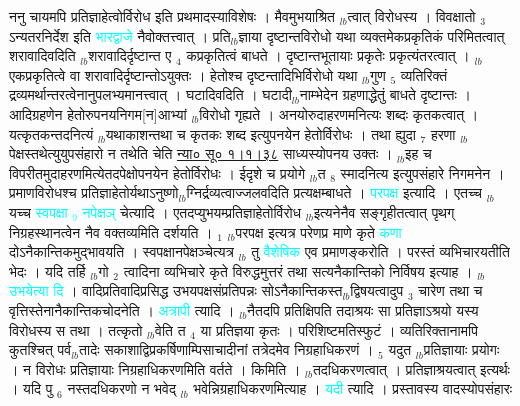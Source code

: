 \documentclass[article,12pt,a4paper]{memoir}%
\newcommand{\quotelemma}[1]{\textcolor{cyan}{#1}}
\begin{document}
	  
	  \pstart \leavevmode%
	ननु चायमपि प्रतिज्ञाहेत्वोर्विरोध इति प्रथमादस्याविशेषः । मैवमुभयाश्रित {\tiny $_{lb}$}त्वात् विरोधस्य । विवक्षातो {\tiny $_{3}$} ऽन्यतरनिर्देश इति \quotelemma{भारद्वाजे} नैवोक्तत्त्वात् । प्रति{\tiny $_{lb}$}ज्ञाया दृष्टान्तविरोधो यथा व्यक्तमेकप्रकृतिकं परिमितत्वात् शरावादिवदिति {\tiny $_{lb}$}शरावादिर्दृष्टान्त ए {\tiny $_{4}$} कप्रकृतित्वं बाधते । दृष्टान्तभूतायाः प्रकृतेः प्रकृत्यंतरत्वात् । {\tiny $_{lb}$}एकप्रकृतित्वे वा शरावादिर्दृष्टान्तोऽयुक्तः । हेतोश्च दृष्टन्तादिभिर्विरोधो यथा {\tiny $_{lb}$}गुण {\tiny $_{5}$} व्यतिरिक्तं द्रव्यमर्थान्तरत्वेनानुपलभ्यमानत्त्वात् । घटादिवदिति । घटादी{\tiny $_{lb}$}नाम्भेदेन ग्रहणाद्धेतुं बाधते दृष्टान्तः । आदिग्रहणेन हेतोरुपनयनिगम[न]आभ्यां {\tiny $_{lb}$}विरोधो गृह्यते । अनयोरुदाहरणमनित्यः शब्दः कृतकत्वात् । यत्कृतकन्तदनित्यं {\tiny $_{lb}$}यथाकाशन्तथा च कृतकः शब्द इत्युपनयेन हेतोर्विरोधः । तथा ह्युदा {\tiny $_{7}$} हरणा {\tiny $_{lb}$}पेक्षस्तथेत्युयुपसंहारो न तथेति चेति \href{http://sarit.indology.info/?cref=ns\%C5\%AB.1.1.38}{न्या० सू० १।१।३८} साध्यस्योपनय उक्तः । {\tiny $_{lb}$}इह च विपरीतमुदाहरणमित्येतदपेक्षोपनयेन हेतोर्विरोधः । ईदृशे च प्रयोगे {\tiny $_{lb}$}त {\tiny $_{8}$} स्मादनित्य इत्युपसंहारे निगमनेन । प्रमाणविरोधश्च प्रतिज्ञाहेतोर्यथाऽनुष्णो{\tiny $_{lb}$}ग्निर्द्रव्यत्वाज्जलवदिति प्रत्यक्षम्बाधते । \quotelemma{परपक्ष} \cite[10a2]{vn-msN} इत्यादि । एतच्च {\tiny $_{lb}$}यच्च \quotelemma{स्वपक्षा {\tiny $_{9}$}\leavevmode\ledsidenote{\textenglish{53a/msK}} नपेक्षञ्} चेत्यादि \cite[10a3]{vn-msN} । एतदप्युभयम्प्रतिज्ञाहेतोर्विरोध {\tiny $_{lb}$}इत्यनेनैव सङ्गृहीतत्वात् पृथग् निग्रहस्थानत्वेन नैव वक्तव्यमिति दर्शयति । {\tiny $_{1}$} {\tiny $_{lb}$}परपक्ष इत्यत्र परेणप्र माणे कृते \quotelemma{कणा} दोऽनैकान्तिकमुद्भावयति । स्वपक्षानपेक्षञ्चेत्यत्र {\tiny $_{lb}$} \leavevmode{} तु \quotelemma{वैशेषिक} एव प्रमाणङ्करोति । परस्तं व्यभिचारयतीति भेदः । यदि तर्हि {\tiny $_{lb}$}गो {\tiny $_{2}$} त्वादिना व्यभिचारे कृते विरुद्धमुत्तरं तथा सत्यनैकान्तिको निर्विषय इत्याह । {\tiny $_{lb}$} \quotelemma{उभयेत्या \cite[10a4]{vn-msN} दि} । वादिप्रतिवादिप्रसिद्ध उभयपक्षसंप्रतिपन्नः सोऽनैकान्तिकस्त{\tiny $_{lb}$}द्विषयत्वादुप {\tiny $_{3}$} चारेण तथा च वृत्तिस्तेनानैकान्तिकचोदनेति । \quotelemma{अत्रापी} \cite[10a3]{vn-msN} त्यादि । {\tiny $_{lb}$}नैतदपि प्रतिक्षिपति तदाश्रयः सा प्रतिज्ञाऽश्रयो यस्य विरोधस्य स तथा । तत्कृतो {\tiny $_{lb}$}वेति त {\tiny $_{4}$} या प्रतिज्ञया कृतः । परिशिष्टमतिस्फुटं । व्यतिरिक्तानामपि कुतश्चित् पर्व{\tiny $_{lb}$}तादेः सकाशाद्विप्रकर्षिणाम्पिसाचादीनां तत्रेदमेव निग्रहाधिकरणं । {\tiny $_{5}$} यदुत {\tiny $_{lb}$}प्रतिज्ञायाः प्रयोगः । न विरोधः प्रतिज्ञायाः निग्रहाधिकरणमिति वर्तते । किमिति । {\tiny $_{lb}$}तदधिकरणत्वात् । प्रतिज्ञाश्रयत्वात् इत्यर्थः । यदि पु {\tiny $_{6}$} नस्तदधिकरणो न भवेद् {\tiny $_{lb}$} \leavevmode{} भवेन्निग्रहाधिकरणमित्याह । \quotelemma{यदी} \cite[10b1]{vn-msN} त्यादि । प्रस्तावस्य वादस्योपसंहारः 
\end{document}
